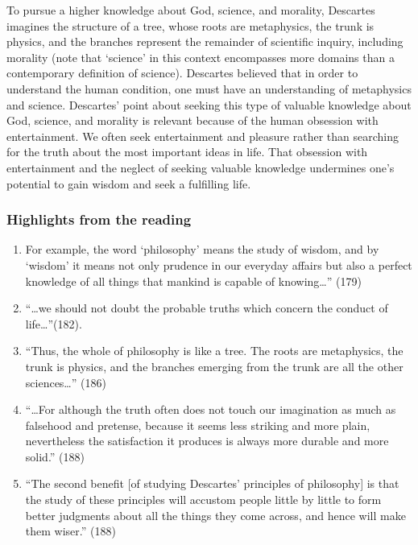 \documentclass[
]{book}
\providecommand{\tightlist}{%
  \setlength{\itemsep}{0pt}\setlength{\parskip}{0pt}}
\begin{document}
To pursue a higher knowledge about God, science, and morality, Descartes imagines the structure of a tree, whose roots are metaphysics, the trunk is physics, and the branches represent the remainder of scientific inquiry, including morality (note that `science' in this context encompasses more domains than a contemporary definition of science). Descartes believed that in order to understand the human condition, one must have an understanding of metaphysics and science. Descartes' point about seeking this type of valuable knowledge about God, science, and morality is relevant because of the human obsession with entertainment. We often seek entertainment and pleasure rather than searching for the truth about the most important ideas in life. That obsession with entertainment and the neglect of seeking valuable knowledge undermines one's potential to gain wisdom and seek a fulfilling life.

\hypertarget{highlights-from-the-reading-1}{%
\subsubsection*{Highlights from the reading}\label{highlights-from-the-reading-1}}

\begin{enumerate}
\def\labelenumi{\arabic{enumi}.}
\tightlist
\item
  For example, the word `philosophy' means the study of wisdom, and by `wisdom' it means not only prudence in our everyday affairs but also a perfect knowledge of all things that mankind is capable of knowing\ldots'' (179)\\
\item
  ``\ldots we should not doubt the probable truths which concern the conduct of life\ldots{}''(182).\\
\item
  ``Thus, the whole of philosophy is like a tree. The roots are metaphysics, the trunk is physics, and the branches emerging from the trunk are all the other sciences\ldots{}'' (186)\\
\item
  ``\ldots For although the truth often does not touch our imagination as much as falsehood and pretense, because it seems less striking and more plain, nevertheless the satisfaction it produces is always more durable and more solid.'' (188)\\
\item
  ``The second benefit {[}of studying Descartes' principles of philosophy{]} is that the study of these principles will accustom people little by little to form better judgments about all the things they come across, and hence will make them wiser.'' (188)
\end{enumerate}
\end{document}
